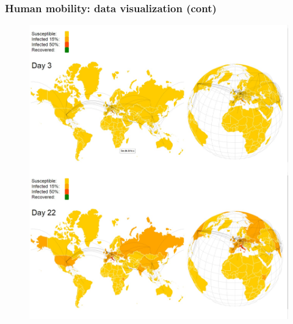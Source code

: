 \documentclass{beamer}
\begin{document}
\begin{frame}
\frametitle{Human mobility: data visualization (cont)}
\begin{figure}[H]\label{fig:perc_diff}
\centering	
\includegraphics[scale=0.09]{img/tot_map1.jpg}
\vspace{10pt}

\end{figure}
\end{frame}
\end{document}
